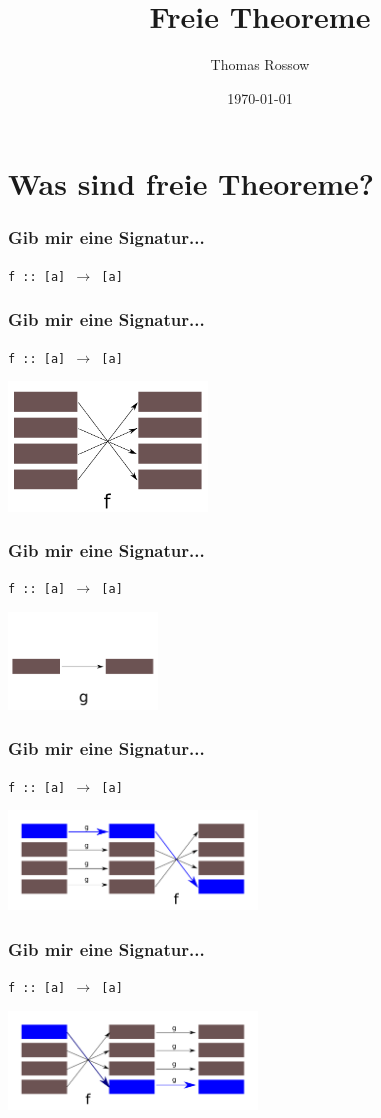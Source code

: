 \documentclass{beamer}
\title{Freie Theoreme}
\author{Thomas Rossow}
\date{\today}
\begin{document}
\maketitle
\frame{\tableofcontents}

\section{Was sind freie Theoreme?}

\begin{frame}
\frametitle{Gib mir eine Signatur...}
\texttt{f :: [a] $\rightarrow$ [a]}
\end{frame}

\begin{frame}
\frametitle{Gib mir eine Signatur...}
\texttt{f :: [a] $\rightarrow$ [a]}

\includegraphics[width=200px]{list-order}
\end{frame}

\begin{frame}
\frametitle{Gib mir eine Signatur...}
\texttt{f :: [a] $\rightarrow$ [a]}

\includegraphics[width=150px]{g-function}
\end{frame}

\begin{frame}
\frametitle{Gib mir eine Signatur...}
\texttt{f :: [a] $\rightarrow$ [a]}

\includegraphics[width=250px]{mapgf}
\end{frame}

\begin{frame}
\frametitle{Gib mir eine Signatur...}
\texttt{f :: [a] $\rightarrow$ [a]}

\includegraphics[width=250px]{fmapg}
\end{frame}
\end{document}
